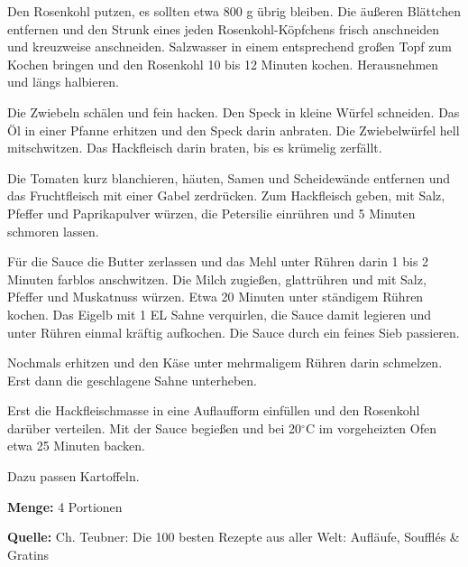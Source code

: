 {\begin{multicols}{2}
\end{multicols}

Den Rosenkohl putzen, es sollten etwa 800 g übrig bleiben. Die äußeren Blättchen entfernen und den Strunk eines jeden Rosenkohl-Köpfchens frisch anschneiden und kreuzweise anschneiden. Salzwasser in einem entsprechend großen Topf zum Kochen bringen und den Rosenkohl 10 bis 12 Minuten kochen. Herausnehmen und längs halbieren.

Die Zwiebeln schälen und fein hacken. Den Speck in kleine Würfel schneiden. Das Öl in einer Pfanne erhitzen und den Speck darin anbraten. Die Zwiebelwürfel hell mitschwitzen. Das Hackfleisch darin braten, bis es krümelig zerfällt.

Die Tomaten kurz blanchieren, häuten, Samen und Scheidewände entfernen und das Fruchtfleisch mit einer Gabel zerdrücken. Zum Hackfleisch geben, mit Salz, Pfeffer und Paprikapulver würzen, die Petersilie einrühren und 5 Minuten schmoren lassen.

Für die Sauce die Butter zerlassen und das Mehl unter Rühren darin 1 bis 2 Minuten farblos anschwitzen. Die Milch zugießen, glattrühren und mit Salz, Pfeffer und Muskatnuss würzen. Etwa 20 Minuten unter ständigem Rühren kochen. Das Eigelb mit 1 EL Sahne verquirlen, die Sauce damit legieren und unter Rühren einmal kräftig aufkochen. Die Sauce durch ein feines Sieb passieren.

Nochmals erhitzen und den Käse unter mehrmaligem Rühren darin schmelzen. Erst dann die geschlagene Sahne unterheben.

Erst die Hackfleischmasse in eine Auflaufform einfüllen und den Rosenkohl darüber verteilen. Mit der Sauce begießen und bei 20$^\circ$C im vorgeheizten Ofen etwa 25 Minuten backen.

Dazu passen Kartoffeln.


{\bfseries Menge:} 4 Portionen

{\bfseries Quelle:} Ch. Teubner: Die 100 besten Rezepte aus aller Welt: Aufläufe, Soufflés \& Gratins 

} 

